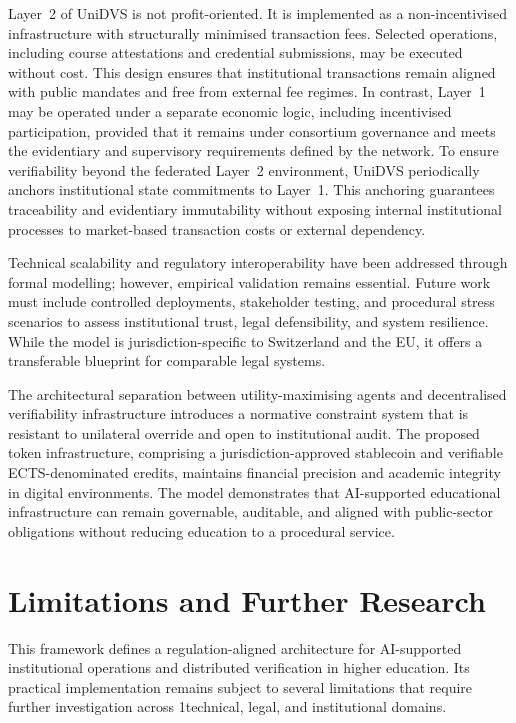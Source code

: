 \documentclass[oneside,10pt]{swissi}
\begin{document}
Layer~2 of UniDVS is not profit-oriented. It is implemented as a non-incentivised infrastructure with structurally minimised transaction fees. Selected operations, including course attestations and credential submissions, may be executed without cost. This design ensures that institutional transactions remain aligned with public mandates and free from external fee regimes. In contrast, Layer~1 may be operated under a separate economic logic, including incentivised participation, provided that it remains under consortium governance and meets the evidentiary and supervisory requirements defined by the network. To ensure verifiability beyond the federated Layer~2 environment, UniDVS periodically anchors institutional state commitments to Layer~1. This anchoring guarantees traceability and evidentiary immutability without exposing internal institutional processes to market-based transaction costs or external dependency.

Technical scalability and regulatory interoperability have been addressed through formal modelling; however, empirical validation remains essential. Future work must include controlled deployments, stakeholder testing, and procedural stress scenarios to assess institutional trust, legal defensibility, and system resilience. While the model is jurisdiction-specific to Switzerland and the EU, it offers a transferable blueprint for comparable legal systems.

The architectural separation between utility-maximising agents and decentralised verifiability infrastructure introduces a normative constraint system that is resistant to unilateral override and open to institutional audit. The proposed token infrastructure, comprising a jurisdiction-approved stablecoin and verifiable ECTS-denominated credits, maintains financial precision and academic integrity in digital environments. The model demonstrates that AI-supported educational infrastructure can remain governable, auditable, and aligned with public-sector obligations without reducing education to a procedural service.

\section{Limitations and Further Research}

This framework defines a regulation-aligned architecture for AI-supported institutional operations and distributed verification in higher education. Its practical implementation remains subject to several limitations that require further investigation across 1technical, legal, and institutional domains.
\end{document}
